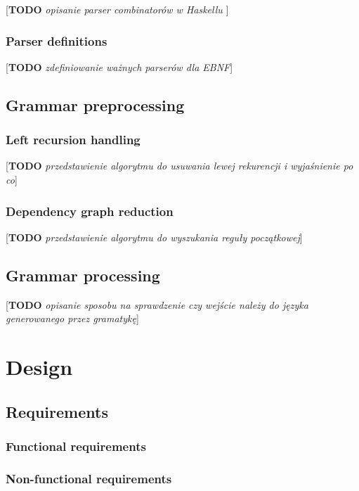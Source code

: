 \documentclass[english,engineering]{wizthesis}
\newcommand{\todo}[1]{{\color{red}[\textbf{TODO} \textit{#1}]}}
\begin{document}
\todo{opisanie parser combinatorów w Haskellu \cite{swierstra-2009}
\cite{leijen-2001} \cite{fokker-1995}}

\subsection{Parser definitions}

\todo{zdefiniowanie ważnych parserów dla EBNF}

\section{Grammar preprocessing}

\subsection{Left recursion handling}

\todo{przedstawienie algorytmu do usuwania lewej rekurencji i wyjaśnienie po co}

\subsection{Dependency graph reduction}

\todo{przedstawienie algorytmu do wyszukania reguły początkowej}

\section{Grammar processing}

\todo{opisanie sposobu na sprawdzenie czy wejście należy do języka generowanego
przez gramatykę}

\chapter{Design}

\section{Requirements}

\subsection{Functional requirements}

\subsection{Non-functional requirements}
\end{document}
